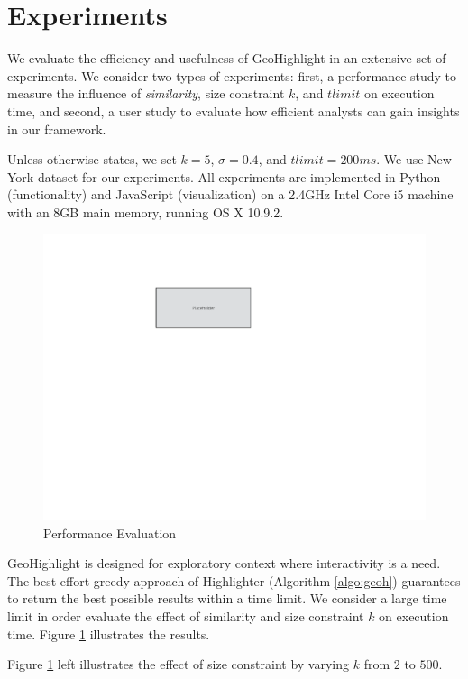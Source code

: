 \section{Experiments}
\label{sec:exp}
We evaluate the efficiency and usefulness of {\sc GeoHighlight} in an extensive set of experiments. We consider two types of experiments: first, a performance study to measure the influence of {\em similarity}, size constraint $k$, and $tlimit$ on execution time, and second, a user study to evaluate how efficient analysts can gain insights in our framework.

\vspace{5pt}
 Unless otherwise states, we set $k = 5$, $\sigma = 0.4$, and $tlimit = 200ms$. We use New York dataset for our experiments. All experiments are implemented in Python (functionality) and JavaScript (visualization) on a 2.4GHz Intel Core i5 machine with an 8GB main memory, running OS X 10.9.2.

\begin{figure}
  \centering
  \includegraphics[width=\columnwidth]{figs/placeholder}
\caption{Performance Evaluation}
\label{fig:performance}
\end{figure}

\vspace{5pt}
 {\sc GeoHighlight} is designed for exploratory context where interactivity is a need. The best-effort greedy approach of {\sc Highlighter} (Algorithm \ref{algo:geoh}) guarantees to return the best possible results within a time limit. We consider a large time limit in order evaluate the effect of similarity and size constraint $k$ on execution time. Figure \ref{fig:performance} illustrates the results.

Figure \ref{fig:performance} left illustrates the effect of size constraint by varying $k$ from $2$ to $500$.

\vspace{5pt}
